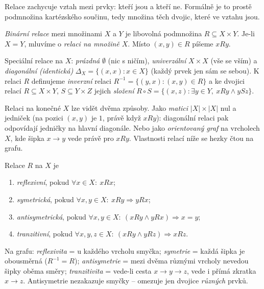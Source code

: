 \documentclass[11pt,a4paper]{article}
\begin{document}
Relace zachycuje vztah mezi prvky: kteří jsou  a kteří ne. Formálně je to prostě podmnožina kartézského součinu, tedy množina těch dvojic, které ve vztahu jsou.

\begin{definice}
\emph{Binární relace} mezi množinami $X$ a $Y$ je libovolná podmnožina $R\subseteq X\times Y$. Je-li $X=Y$, mluvíme o \emph{relaci na množině $X$}. Místo $(x,y)\in R$ píšeme $xRy$.
\end{definice}

\begin{poznamka}
Speciální relace na $X$: \emph{prázdná} $\emptyset$ (nic s ničím), \emph{univerzální} $X\times X$ (vše se vším) a \emph{diagonální (identická)} $\Delta_X=\{(x,x):x\in X\}$ (každý prvek jen sám se sebou). K relaci $R$ definujeme \emph{inverzní} relaci $R^{-1}=\{(y,x):(x,y)\in R\}$ a ke dvojici relací $R\subseteq X\times Y$, $S\subseteq Y\times Z$ jejich \emph{složení} $R\circ S=\{(x,z):\exists y\in Y,\ xRy\wedge ySz\}$.
\end{poznamka}

\begin{intuice}
Relaci na konečné $X$ lze vidět dvěma způsoby. Jako \emph{matici} $|X|\times|X|$ nul a jedniček (na pozici $(x,y)$ je $1$, právě když $xRy$): diagonální relaci pak odpovídají jedničky na hlavní diagonále. Nebo jako \emph{orientovaný graf} na vrcholech $X$, kde šipka $x\to y$ vede právě pro $xRy$. Vlastnosti relací níže se hezky čtou na grafu.
\end{intuice}

\begin{definice}
Relace $R$ na $X$ je
\begin{enumerate}[label=(\arabic*)]
  \item \emph{reflexivní}, pokud $\forall x\in X:\ xRx$;
  \item \emph{symetrická}, pokud $\forall x,y\in X:\ xRy\Rightarrow yRx$;
  \item \emph{antisymetrická}, pokud $\forall x,y\in X:\ (xRy\wedge yRx)\Rightarrow x=y$;
  \item \emph{tranzitivní}, pokud $\forall x,y,z\in X:\ (xRy\wedge yRz)\Rightarrow xRz$.
\end{enumerate}
\end{definice}

\begin{intuice}
Na grafu: \emph{reflexivita} = u každého vrcholu smyčka; \emph{symetrie} = každá šipka je obousměrná ($R^{-1}=R$); \emph{antisymetrie} = mezi dvěma různými vrcholy nevedou šipky oběma směry; \emph{tranzitivita} = vede-li cesta $x\to y\to z$, vede i přímá zkratka $x\to z$. Antisymetrie nezakazuje smyčky -- omezuje jen dvojice \emph{různých} prvků.
\end{intuice}
\end{document}
